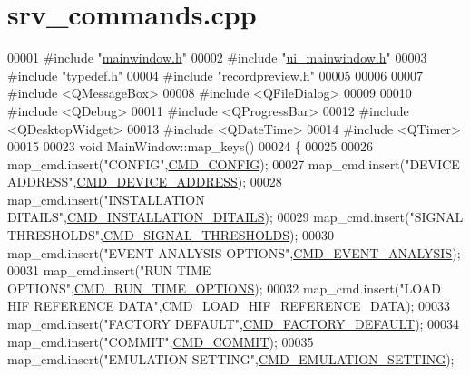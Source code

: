 \hypertarget{a00047_source}{\section{srv\+\_\+commands.\+cpp}
\label{a00047_source}
}

\begin{DoxyCode}
00001 \textcolor{preprocessor}{#include "\hyperlink{a00039}{mainwindow.h}"}
00002 \textcolor{preprocessor}{#include "\hyperlink{a00052}{ui\_mainwindow.h}"}
00003 \textcolor{preprocessor}{#include "\hyperlink{a00001}{typedef.h}"}
00004 \textcolor{preprocessor}{#include "\hyperlink{a00043}{recordpreview.h}"}
00005 
00006 
00007 \textcolor{preprocessor}{#include <QMessageBox>}
00008 \textcolor{preprocessor}{#include <QFileDialog>}
00009 
00010 \textcolor{preprocessor}{#include <QDebug>}
00011 \textcolor{preprocessor}{#include <QProgressBar>}
00012 \textcolor{preprocessor}{#include <QDesktopWidget>}
00013 \textcolor{preprocessor}{#include <QDateTime>}
00014 \textcolor{preprocessor}{#include <QTimer>}
00015 
00023 \textcolor{keywordtype}{void} MainWindow::map\_keys()
00024 \{
00025 
00026     map\_cmd.insert(\textcolor{stringliteral}{"CONFIG"},\hyperlink{a00031_aa87bfa4fccf7f7a4fc45afb1966a655f}{CMD\_CONFIG});
00027     map\_cmd.insert(\textcolor{stringliteral}{"DEVICE ADDRESS"},\hyperlink{a00031_a7c6a5f4023cb02d02f2ded23147be425}{CMD\_DEVICE\_ADDRESS});
00028     map\_cmd.insert(\textcolor{stringliteral}{"INSTALLATION DITAILS"},\hyperlink{a00031_af91ff280feea1f52e3bdd7f0f556d153}{CMD\_INSTALLATION\_DITAILS});
00029     map\_cmd.insert(\textcolor{stringliteral}{"SIGNAL THRESHOLDS"},\hyperlink{a00031_ac361dc1b32c1036394be0fd7de1182ca}{CMD\_SIGNAL\_THRESHOLDS});
00030     map\_cmd.insert(\textcolor{stringliteral}{"EVENT ANALYSIS OPTIONS"},\hyperlink{a00031_a3a15793e3ab7817f2429edf04de693a0}{CMD\_EVENT\_ANALYSIS});
00031     map\_cmd.insert(\textcolor{stringliteral}{"RUN TIME OPTIONS"},\hyperlink{a00031_a1d8673a7ca545f3e382fc538f543ab72}{CMD\_RUN\_TIME\_OPTIONS});
00032     map\_cmd.insert(\textcolor{stringliteral}{"LOAD HIF REFERENCE DATA"},\hyperlink{a00031_afc4f83cb04e57ee185a039b10e19e297}{CMD\_LOAD\_HIF\_REFERENCE\_DATA});
00033     map\_cmd.insert(\textcolor{stringliteral}{"FACTORY DEFAULT"},\hyperlink{a00031_a8ad7dae51114833acbb665d703d8ffeb}{CMD\_FACTORY\_DEFAULT});
00034     map\_cmd.insert(\textcolor{stringliteral}{"COMMIT"},\hyperlink{a00031_a7df85bf97a6a032220d7a71c78be5206}{CMD\_COMMIT});
00035     map\_cmd.insert(\textcolor{stringliteral}{"EMULATION SETTING"},\hyperlink{a00031_a230386ac00f9c01793857101e1680324}{CMD\_EMULATION\_SETTING});

\end{DoxyCode}
